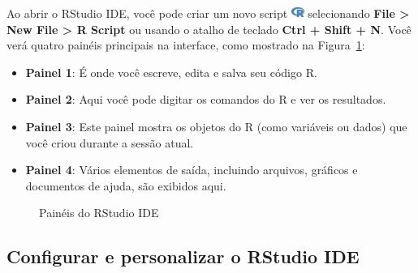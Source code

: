 \documentclass[
  letterpaper,
]{book}
\providecommand{\tightlist}{%
  \setlength{\itemsep}{0pt}\setlength{\parskip}{0pt}}\usepackage{longtable,booktabs,array}
\theoremstyle{plain}
\theoremstyle{definition}
\theoremstyle{remark}
\begin{document}
Ao abrir o RStudio IDE, você pode criar um novo script
\includegraphics[width=1.13em,height=1em]{getting_started_with_r_files/figure-pdf/fa-icon-9b00320707d42527dde67262afb33ded.pdf}
selecionando \textbf{File \textgreater{} New File \textgreater{} R
Script} ou usando o atalho de teclado \textbf{Ctrl + Shift + N}. Você
verá quatro painéis principais na interface, como mostrado na
Figura~\ref{fig-rstudio-ide-panels}:

\begin{itemize}
\tightlist
\item
  \textbf{Painel 1}: É onde você escreve, edita e salva seu código R.
\item
  \textbf{Painel 2}: Aqui você pode digitar os comandos do R e ver os
  resultados.
\item
  \textbf{Painel 3}: Este painel mostra os objetos do R (como variáveis
  ou dados) que você criou durante a sessão atual.
\item
  \textbf{Painel 4}: Vários elementos de saída, incluindo arquivos,
  gráficos e documentos de ajuda, são exibidos aqui.
\end{itemize}

\begin{figure}


\caption{\label{fig-rstudio-ide-panels}Painéis do RStudio IDE}

\end{figure}%

\subsection{Configurar e personalizar o RStudio
IDE}\label{configurar-e-personalizar-o-rstudio-ide}
\end{document}
